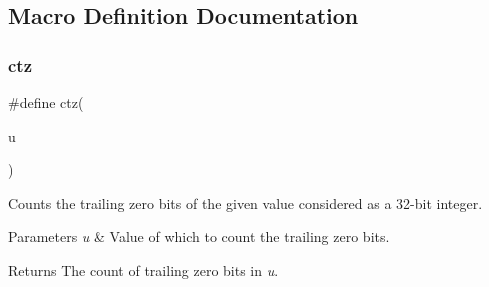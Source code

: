 \subsection{Macro Definition Documentation}
\mbox{\label{group__interrupt__deprecated__group_gab069bfec305db5213465d3b689836404}} 
\subsubsection{\texorpdfstring{ctz}{ctz}}
{\footnotesize\ttfamily \#define ctz(\begin{DoxyParamCaption}\item[{}]{u }\end{DoxyParamCaption})}



Counts the trailing zero bits of the given value considered as a 32-\/bit integer. 


\begin{DoxyParams}{Parameters}
{\em u} & Value of which to count the trailing zero bits.\\
\hline
\end{DoxyParams}
\begin{DoxyReturn}{Returns}
The count of trailing zero bits in {\itshape u}. 
\end{DoxyReturn}
